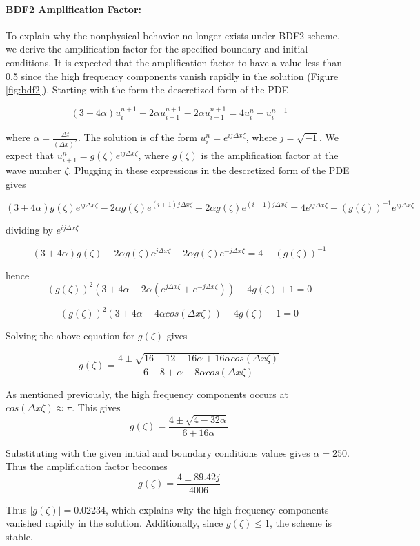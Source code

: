 \paragraph{BDF2 Amplification Factor:} To explain why the nonphysical behavior no longer exists under BDF2 scheme, we derive the amplification factor for the specified boundary and initial conditions. It is expected that the amplification factor to have a value less than 0.5 since the high frequency components vanish rapidly in the solution (Figure \ref{fig:bdf2}). 
Starting with the form the descretized form of the PDE

$$
(3+4\alpha)u_{i}^{n+1} - 2\alpha u_{i+1}^{n+1} - 2\alpha u_{i-1}^{n+1} = 4u_{i}^{n} - u_{i}^{n-1}
$$

where $\alpha = \frac{\Delta t}{(\Delta x)^{2}}$. The solution is of the form $u_{i}^{n}=e^{ij\Delta x \zeta}$, where $j=\sqrt{-1}$. We expect that $u_{i+1}^{n}=g(\zeta)e^{ij\Delta x \zeta}$, where $g(\zeta)$ is the amplification factor at the wave number $\zeta$. Plugging in these expressions in the descretized form of the PDE gives

$$
(3+4\alpha)g(\zeta)e^{ij\Delta x \zeta} -2\alpha g(\zeta)e^{(i+1)j\Delta x \zeta} - 2\alpha g(\zeta)e^{(i-1)j\Delta x \zeta} = 4e^{ij\Delta x \zeta} - (g(\zeta))^{-1}e^{ij\Delta x \zeta}
$$

dividing by $e^{ij\Delta x \zeta}$

$$
(3+4\alpha)g(\zeta) -2\alpha g(\zeta)e^{j\Delta x \zeta} - 2\alpha g(\zeta)e^{-j\Delta x \zeta} = 4 - (g(\zeta))^{-1}
$$

hence
$$
(g(\zeta))^{2} (3+4\alpha-2\alpha(e^{j\Delta x \zeta} +e^{-j\Delta x \zeta}))-4g(\zeta)+1=0
$$

$$
(g(\zeta))^{2} (3+4\alpha-4\alpha cos(\Delta x \zeta))-4g(\zeta)+1=0
$$

Solving the above equation for $g(\zeta)$ gives

$$
g(\zeta) = \frac{4 \pm \sqrt{16-12-16\alpha +16\alpha cos(\Delta x \zeta)}}{6+8+\alpha-8\alpha cos(\Delta x \zeta)}
$$

As mentioned previously, the high frequency components occurs at $cos(\Delta x \zeta)\approx \pi$. This gives
$$
g(\zeta) = \frac{4 \pm \sqrt{4-32\alpha}}{6+16\alpha}
$$

Substituting with the given initial and boundary conditions values gives $\alpha = 250$. Thus the amplification factor becomes 
$$
g(\zeta) = \frac{4 \pm 89.42j}{4006}
$$

Thus $|g(\zeta)| = 0.02234$, which explains why the high frequency components vanished rapidly in the solution. Additionally, since $g(\zeta)\leq 1$, the scheme is stable.

